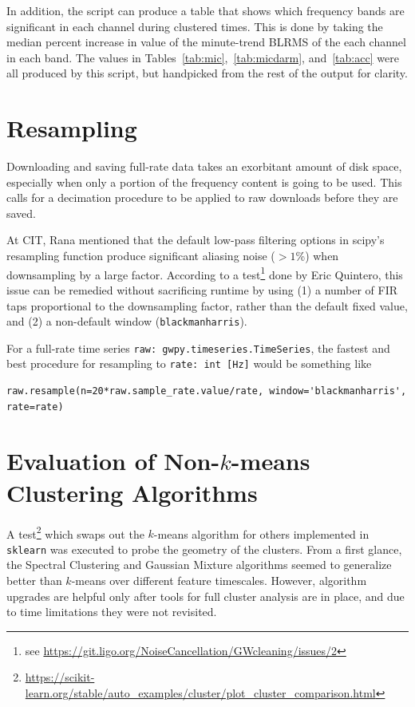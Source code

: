 \documentclass[colorlinks=true,pdfstartview=FitV,linkcolor=blue,
            citecolor=red,urlcolor=magenta]{ligodoc}
\begin{document}
In addition, the script can produce a table that shows which frequency bands are significant in each channel during clustered times.
This is done by taking the median percent increase in value of the minute-trend BLRMS of the each channel in each band.
The values in Tables~\ref{tab:mic},~\ref{tab:micdarm}, and~\ref{tab:acc} were all produced by this script, but handpicked from the rest of the output for clarity.


\appendix
\appendixpage
\section{Resampling}
Downloading and saving full-rate data takes an exorbitant amount of disk space, especially when only a portion of the frequency content is going to be used.
This calls for a decimation procedure to be applied to raw downloads before they are saved.

At CIT, Rana mentioned that the default low-pass filtering options in scipy's resampling function produce significant aliasing noise ($>1$\%) when downsampling by a large factor.
According to a test\footnote{see \url{https://git.ligo.org/NoiseCancellation/GWcleaning/issues/2}} done by Eric Quintero, this issue can be remedied without sacrificing runtime by using (1) a number of FIR taps proportional to the downsampling factor, rather than the default fixed value, and (2) a non-default window (\texttt{blackmanharris}).


For a full-rate time series \texttt{raw: gwpy.timeseries.TimeSeries}, the fastest and best procedure for resampling to \texttt{rate: int [Hz]} would be something like
\begin{verbatim}
raw.resample(n=20*raw.sample_rate.value/rate, window='blackmanharris', rate=rate)
\end{verbatim}

\section{Evaluation of Non-$k$-means Clustering Algorithms}\label{app:algo}
A test\footnote{\url{https://scikit-learn.org/stable/auto_examples/cluster/plot_cluster_comparison.html}} which swaps out the $k$-means algorithm for others implemented in \texttt{sklearn} was executed to probe the geometry of the clusters.
From a first glance, the Spectral Clustering and Gaussian Mixture algorithms seemed to generalize better than $k$-means over different feature timescales.
However, algorithm upgrades are helpful only after tools for full cluster analysis are in place, and due to time limitations they were not revisited.


\end{document}
